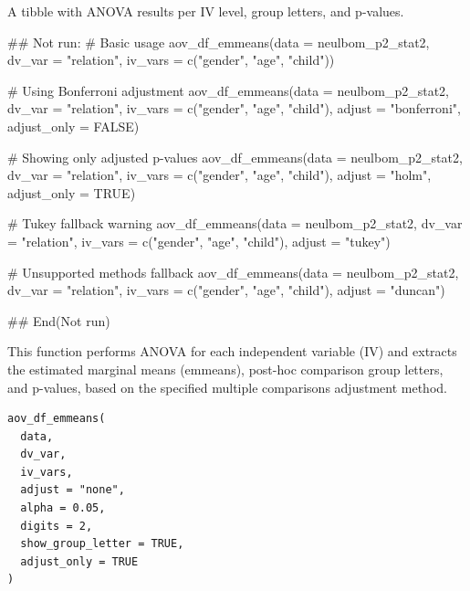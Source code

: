 \documentclass[a4paper]{book}
\begin{document}
%
\begin{Value}
A tibble with ANOVA results per IV level, group letters, and p-values.
\end{Value}
%
\begin{Examples}
\begin{ExampleCode}
## Not run: 
# Basic usage
aov_df_emmeans(data = neulbom_p2_stat2,
               dv_var = "relation",
               iv_vars = c("gender", "age", "child"))

# Using Bonferroni adjustment
aov_df_emmeans(data = neulbom_p2_stat2,
               dv_var = "relation",
               iv_vars = c("gender", "age", "child"),
               adjust = "bonferroni", adjust_only = FALSE)

# Showing only adjusted p-values
aov_df_emmeans(data = neulbom_p2_stat2,
               dv_var = "relation",
               iv_vars = c("gender", "age", "child"),
               adjust = "holm", adjust_only = TRUE)

# Tukey fallback warning
aov_df_emmeans(data = neulbom_p2_stat2,
               dv_var = "relation",
               iv_vars = c("gender", "age", "child"),
               adjust = "tukey")

# Unsupported methods fallback
aov_df_emmeans(data = neulbom_p2_stat2,
               dv_var = "relation",
               iv_vars = c("gender", "age", "child"),
               adjust = "duncan")

## End(Not run)
\end{ExampleCode}
\end{Examples}
%
\begin{Description}
This function performs ANOVA for each independent variable (IV) and extracts
the estimated marginal means (emmeans), post-hoc comparison group letters, and
p-values, based on the specified multiple comparisons adjustment method.
\end{Description}
%
\begin{Usage}
\begin{verbatim}
aov_df_emmeans(
  data,
  dv_var,
  iv_vars,
  adjust = "none",
  alpha = 0.05,
  digits = 2,
  show_group_letter = TRUE,
  adjust_only = TRUE
)
\end{verbatim}
\end{Usage}
%
\end{document}
